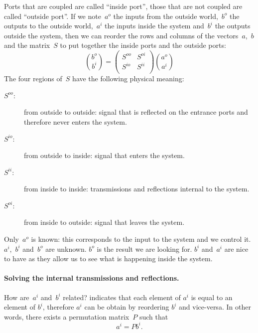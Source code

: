 Ports that are coupled are called ``inside port'', those that are not coupled are called ``outside port''.
If we note~$a^o$ the inputs from the outside world,~$b^o$ the outputs to the outside world,~$a^i$ the inputs inside the system and~$b^i$ the outputs outside the system, then we can reorder the rows and columns of the vectors~$a$,~$b$ and the matrix~$S$ to put together the inside ports and the outside ports: 
\begin{equation}
    \binom{b^o}{b^i} =
    \begin{pmatrix}
        S^{oo} & S^{oi} \\
        S^{io} & S^{ii} \\
    \end{pmatrix}
    \binom{a^o}{a^i}
    \label{eq:s_outside_inside}
\end{equation}
The four regions of~$S$ have the following physical meaning:
\begin{description}
    \item[$S^{oo}$:] from outside to outside: signal that is reflected on the entrance ports and therefore never enters the system.
    \item[$S^{io}$:] from outside to inside: signal that enters the system.
    \item[$S^{ii}$:] from inside to inside: transmissions and reflections internal to the system.
    \item[$S^{oi}$:] from inside to outside: signal that leaves the system.
\end{description}
Only~$a^o$ is known: this corresponds to the input to the system and we control it.
$a^i$,~$b^i$ and~$b^o$ are unknown.
$b^o$ is the result we are looking for.
$b^i$ and~$a^i$ are nice to have as they allow us to see what is happening inside the system.

\paragraph{Solving the internal transmissions and reflections.}
How are~$a^i$ and~$b^i$ related?
 indicates that each element of $a^i$ is equal to an element of $b^i$, therefore $a^i$ can be obtain by reordering $b^i$ and vice-versa.
In other words, there exists a permutation matrix~$P$ such that
\begin{equation}
    a^i = P b^i \text{.} \label{eq:relation_ai_bi}
\end{equation}

